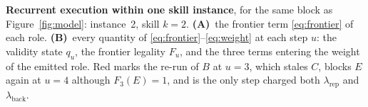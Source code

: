 \caption{\textbf{Recurrent execution within one skill instance}, for the same
block as Figure~\ref{fig:model}: instance~2, skill $k=2$. \textbf{(A)}~the
frontier term \eqref{eq:frontier} of each role. \textbf{(B)}~every quantity of
\eqref{eq:frontier}--\eqref{eq:weight} at each step $u$: the validity state
$q_u$, the frontier legality $F_u$, and the three terms entering the weight of
the emitted role. Red marks the re-run of $B$ at $u=3$, which stales $C$, blocks
$E$ again at $u=4$ although $F_3(E)=1$, and is the only step charged both
$\lambda_{\mathrm{rep}}$ and $\lambda_{\mathrm{back}}$.}
\label{fig:recurrent}
